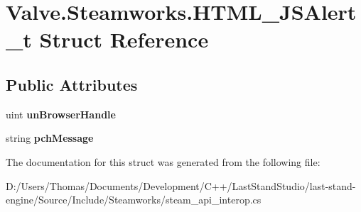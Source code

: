 \hypertarget{structValve_1_1Steamworks_1_1HTML__JSAlert__t}{}\section{Valve.\+Steamworks.\+H\+T\+M\+L\+\_\+\+J\+S\+Alert\+\_\+t Struct Reference}
\label{structValve_1_1Steamworks_1_1HTML__JSAlert__t}
\subsection*{Public Attributes}
\begin{DoxyCompactItemize}
\item 
\hypertarget{structValve_1_1Steamworks_1_1HTML__JSAlert__t_ad4aea51fedc67f363edb1bbad091a0a3}{}uint {\bfseries un\+Browser\+Handle}\label{structValve_1_1Steamworks_1_1HTML__JSAlert__t_ad4aea51fedc67f363edb1bbad091a0a3}

\item 
\hypertarget{structValve_1_1Steamworks_1_1HTML__JSAlert__t_a28e6ec06108749a8d2f606fe43a835fd}{}string {\bfseries pch\+Message}\label{structValve_1_1Steamworks_1_1HTML__JSAlert__t_a28e6ec06108749a8d2f606fe43a835fd}

\end{DoxyCompactItemize}


The documentation for this struct was generated from the following file\+:\begin{DoxyCompactItemize}
\item 
D\+:/\+Users/\+Thomas/\+Documents/\+Development/\+C++/\+Last\+Stand\+Studio/last-\/stand-\/engine/\+Source/\+Include/\+Steamworks/steam\+\_\+api\+\_\+interop.\+cs\end{DoxyCompactItemize}
